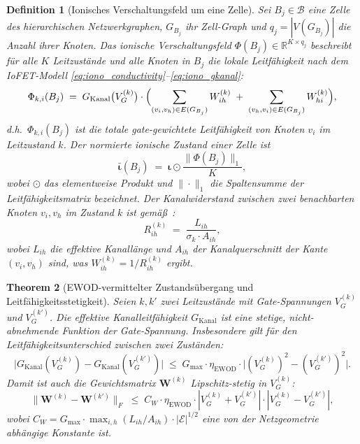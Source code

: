 ﻿\documentclass[12pt, a4paper, openany]{report}
\newtheorem{theorem}{Theorem}[chapter]
\newtheorem{definition}[theorem]{Definition}
\newcommand{\R}{\mathbb{R}}
\newcommand{\calE}{\mathcal{E}}
\newcommand{\calB}{\mathcal{B}}
\begin{document}
\begin{definition}[Ionisches Verschaltungsfeld um eine Zelle]
\label{def:ionic_field}
Sei $B_j \in \calB$ eine Zelle des hierarchischen Netzwerkgraphen,
$G_{B_j}$ ihr Zell-Graph und $q_j = |V(G_{B_j})|$ die Anzahl ihrer Knoten.
Das \emph{ionische Verschaltungsfeld}
$\Phi(B_j) \in \R^{K \times q_j}$ beschreibt für alle $K$ Leitzustände
und alle Knoten in $B_j$ die lokale Leitfähigkeit nach dem IoFET-Modell
\eqref{eq:iono_conductivity}--\eqref{eq:iono_gkanal}:
\[
  \Phi_{k,i}(B_j)
  \;=\;
  G_{\mathrm{Kanal}}\bigl(V_G^{(k)}\bigr) \cdot
  \Bigl(
    \sum_{(v_i, v_h) \in E(G_{B_j})} W^{(k)}_{ih}
    \;+\;
    \sum_{(v_h, v_i) \in E(G_{B_j})} W^{(k)}_{hi}
  \Bigr),
\]
d.h.\ $\Phi_{k,i}(B_j)$ ist die totale gate-gewichtete Leitfähigkeit
von Knoten $v_i$ im Leitzustand $k$.  Der normierte ionische Zustand
einer Zelle ist
\[
  \bar{\bm{\iota}}(B_j)
  \;=\; \bm{\iota} \odot \frac{\|\Phi(B_j)\|_1}{K},
\]
wobei $\odot$ das elementweise Produkt und $\|\cdot\|_1$ die Spaltensumme
der Leitfähigkeitsmatrix bezeichnet.  Der Kanalwiderstand zwischen zwei
benachbarten Knoten $v_i, v_h$ im Zustand $k$ ist gemäß~\cite{epp2026iono}:
\begin{equation}
  \label{eq:ionic_channel_resistance}
  R^{(k)}_{ih}
  \;=\; \frac{L_{ih}}{\sigma_k \cdot A_{ih}},
\end{equation}
wobei $L_{ih}$ die effektive Kanallänge und $A_{ih}$ der Kanalquerschnitt
der Kante $(v_i, v_h)$ sind, was $W^{(k)}_{ih} = 1 / R^{(k)}_{ih}$
ergibt.
\end{definition}

\begin{theorem}[EWOD-vermittelter Zustandsübergang und Leitfähigkeitsstetigkeit]
\label{thm:ionic_ewod_continuity}
Seien $k, k'$ zwei Leitzustände mit Gate-Spannungen $V_G^{(k)}$ und
$V_G^{(k')}$.  Die effektive Kanalleitfähigkeit $G_{\mathrm{Kanal}}$ ist
eine stetige, nicht-abnehmende Funktion der Gate-Spannung.  Insbesondere
gilt für den Leitfähigkeitsunterschied zwischen zwei Zuständen:
\begin{equation}
  \label{eq:ionic_ewod_diff}
  \bigl|G_{\mathrm{Kanal}}(V_G^{(k)}) - G_{\mathrm{Kanal}}(V_G^{(k')})\bigr|
  \;\leq\;
  G_{\max} \cdot \eta_{\mathrm{EWOD}} \cdot
  \bigl|(V_G^{(k)})^2 - (V_G^{(k')})^2\bigr|.
\end{equation}
Damit ist auch die Gewichtsmatrix $\bm{W}^{(k)}$ Lipschitz-stetig in $V_G^{(k)}$:
\begin{equation}
  \label{eq:ionic_w_lipschitz_vg}
  \|\bm{W}^{(k)} - \bm{W}^{(k')}\|_F
  \;\leq\;
  C_W \cdot \eta_{\mathrm{EWOD}} \cdot |V_G^{(k)} + V_G^{(k')}| \cdot
  |V_G^{(k)} - V_G^{(k')}|,
\end{equation}
wobei $C_W = G_{\max} \cdot \max_{i,h} (L_{ih}/A_{ih}) \cdot |\calE|^{1/2}$
eine von der Netzgeometrie abhängige Konstante ist.
\end{theorem}
\end{document}
